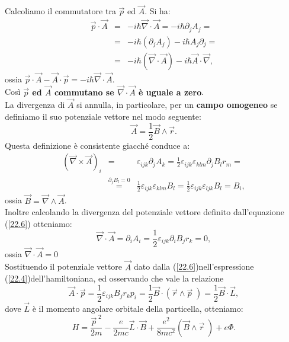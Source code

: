 \documentclass[a4paper,12pt,oneside]{book}
\begin{document}
Calcoliamo il commutatore tra $\vec{p}$ ed $\vec{A}$. Si ha:
\begin{eqnarray}
\vec{p}\cdot\vec{A}&=&-i\hbar \vec{\nabla}\cdot\vec{A}=-i\hbar\partial_{j}A_{j}= \nonumber \\
&=&-i\hbar(\partial_{j}A_{j})-i\hbar A_{j}\partial_{j}= \nonumber \\
&=& -i\hbar(\vec{\nabla}\cdot\vec{A})-i\hbar\vec{A}\cdot\vec{\nabla} ,
\end{eqnarray}
ossia $\vec{p}\cdot\vec{A}-\vec{A}\cdot\vec{p}=-i\hbar\vec{\nabla}\cdot\vec{A}$.\\ Così \textbf{$\vec{p}$ ed $\vec{A}$ commutano se $\vec{\nabla}\cdot\vec{A}$ è uguale a zero}.\\ La divergenza di $\vec{A}$ si annulla, in particolare, per un \textbf{campo omogeneo} se definiamo il suo potenziale vettore nel modo seguente:
\begin{equation}
\vec{A}=\frac{1}{2}\vec{B}\wedge\vec{r} .
\label{22.6}
\end{equation}
Questa definizione è consistente giacché conduce a:
\begin{eqnarray}
(\vec{\nabla}\times\vec{A})_{i}&=&\varepsilon_{ijk}\partial_{j}A_{k}=\frac{1}{2}\varepsilon_{ijk}\varepsilon_{klm}\partial_{j}B_{l}r_{m}= \nonumber \\
&\overset{\partial_{j}B_{l}=0}{=}&  \frac{1}{2}\varepsilon_{ijk}\varepsilon_{klm}B_{l}=\frac{1}{2}\varepsilon_{ijk}\varepsilon_{ljk}B_{l}=B_{i} ,
\end{eqnarray}
ossia $\vec{B}=\vec{\nabla}\wedge\vec{A}$.\\
Inoltre calcolando la divergenza del potenziale vettore definito dall'equazione (\ref{22.6}) otteniamo:
\begin{equation}
\vec{\nabla}\cdot\vec{A}=\partial_{i}A_{i}=\frac{1}{2}\varepsilon_{ijk}\partial_{i}B_{j}r_{k}=0 ,
\end{equation}
ossia $\vec{\nabla}\cdot\vec{A}=0$\\
Sostituendo il potenziale vettore $\vec{A}$ dato dalla (\ref{22.6})nell'espressione (\ref{22.4})dell'hamiltoniana, ed osservando che vale la relazione
\begin{equation}
\vec{A}\cdot\vec{p}=\frac{1}{2}\varepsilon_{ijk}B_{j}r_{k}p_{i}=\frac{1}{2}\vec{B}\cdot(\vec{r}\wedge\vec{p}\;)=\frac{1}{2}\vec{B}\cdot\vec{L} ,
\end{equation}
dove $\vec{L}$ è il momento angolare orbitale della particella, otteniamo:
\begin{equation}
H=\frac{\vec{p}^{\;2}}{2m}-\frac{e}{2mc}\vec{L}\cdot\vec{B}+\frac{e^{2}}{8mc^{2}}(\vec{B}\wedge\vec{r}\;)+e\Phi .
\label{22.10}
\end{equation}
\end{document}
